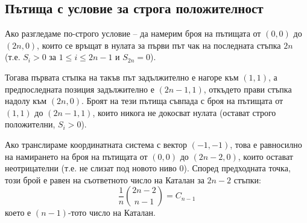 \documentclass[12pt]{article}
\begin{document}
\subsection{Пътища с условие за строга положителност}
Ако разгледаме по-строго условие – да намерим броя на пътищата от $(0,0)$ до $(2n,0)$, които се връщат в нулата за първи път чак на последната стъпка $2n$ (т.е. $S_i > 0$ за $1 \leq i \leq 2n-1$ и $S_{2n} = 0$).

Тогава първата стъпка на такъв път задължително е нагоре към $(1,1)$, а предпоследната позиция задължително е $(2n-1, 1)$, откъдето прави стъпка надолу към $(2n,0)$.
Броят на тези пътища съвпада с броя на пътищата от $(1,1)$ до $(2n-1, 1)$, които никога не докосват нулата (остават строго положителни, $S_i > 0$). 

Ако транслираме координатната система с вектор $(-1,-1)$, това е равносилно на намирането на броя на пътищата от $(0,0)$ до $(2n-2, 0)$, които остават неотрицателни (т.е. не слизат под новото ниво 0).
Според предходната точка, този брой е равен на съответното число на Каталан за $2n-2$ стъпки:
\[ \frac{1}{n} \binom{2n-2}{n-1} = C_{n-1} \]
което е $(n-1)$-тото число на Каталан.
\end{document}
